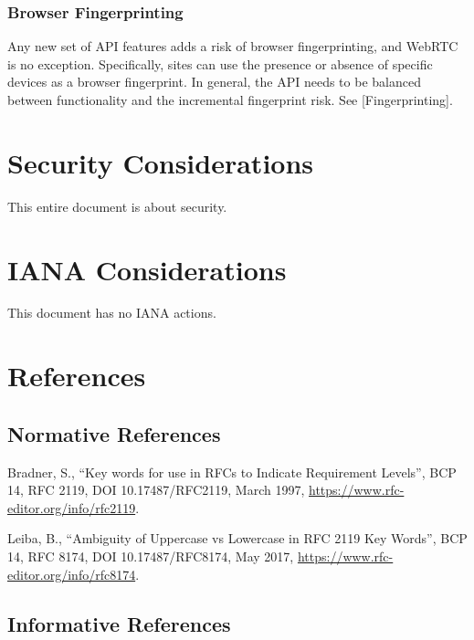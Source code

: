 \documentclass{article}
\begin{document}
\subsubsection{Browser Fingerprinting}

Any new set of API features adds a risk of browser fingerprinting,
and WebRTC is no exception.  Specifically, sites can use the presence
or absence of specific devices as a browser fingerprint.  In general,
the API needs to be balanced between functionality and the
incremental fingerprint risk.  See [Fingerprinting].

\section{Security Considerations}

This entire document is about security.

\section{IANA Considerations}

This document has no IANA actions.

\section{References}

\subsection{Normative References}

\begin{description}[style=nextline, labelwidth=10em, leftmargin=10em]
\item[{[RFC2119]}] Bradner, S., ``Key words for use in RFCs to Indicate
   Requirement Levels'', BCP 14, RFC 2119,
   DOI 10.17487/RFC2119, March 1997,
   \url{https://www.rfc-editor.org/info/rfc2119}.

\item[{[RFC8174]}] Leiba, B., ``Ambiguity of Uppercase vs Lowercase in RFC
   2119 Key Words'', BCP 14, RFC 8174, DOI 10.17487/RFC8174,
   May 2017, \url{https://www.rfc-editor.org/info/rfc8174}.
\end{description}

\subsection{Informative References}
\end{document}
